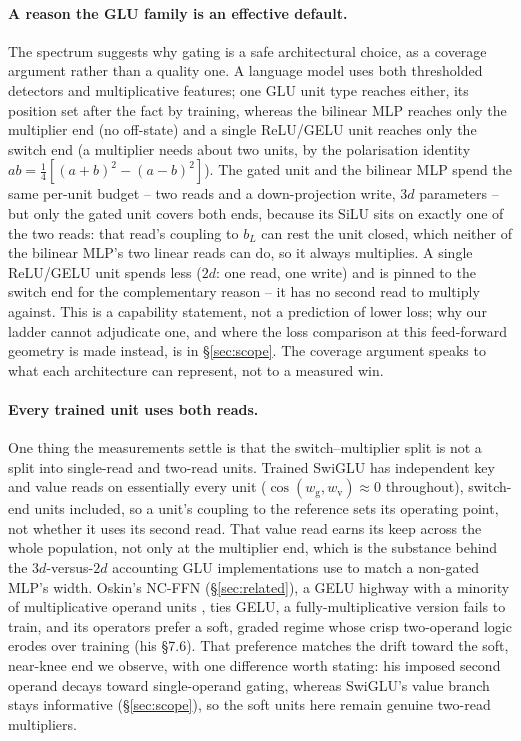 \documentclass[11pt]{article}
\newcommand{\bl}{b_L}
\newcommand{\wg}{w_{\mathrm{g}}}
\newcommand{\wv}{w_{\mathrm{v}}}
\begin{document}
\paragraph{A reason the GLU family is an effective default.}
The spectrum suggests why gating is a safe architectural choice, as a coverage
argument rather than a quality one. A language model uses both thresholded
detectors and multiplicative features; one GLU unit type reaches either, its
position set after the fact by training, whereas the bilinear MLP reaches only
the multiplier end (no off-state) and a single ReLU/GELU unit reaches only the
switch end (a multiplier needs about two units, by the polarisation identity
$ab=\tfrac14[(a{+}b)^2-(a{-}b)^2]$). The gated unit and the bilinear MLP spend
the same per-unit budget -- two reads and a down-projection write, $3d$
parameters -- but only the gated unit covers both ends, because its SiLU sits
on exactly one of the two reads: that read's coupling to $\bl$ can rest the
unit closed, which neither of the bilinear MLP's two linear reads can do, so it
always multiplies. A single ReLU/GELU unit spends less ($2d$: one read, one
write) and is pinned to the switch end for the complementary reason -- it has no
second read to multiply against. This is a capability statement,
not a prediction of lower loss; why our ladder cannot adjudicate one, and where
the loss comparison at this feed-forward geometry is made instead, is in
\S\ref{sec:scope}. The coverage argument speaks to what each architecture can
represent, not to a measured win.

\paragraph{Every trained unit uses both reads.}
One thing the measurements settle is that the switch--multiplier split is not a
split into single-read and two-read units. Trained SwiGLU has independent key and
value reads on essentially every unit ($\cos(\wg,\wv)\approx 0$ throughout),
switch-end units included, so a unit's coupling to the reference sets its
operating point, not whether it uses its second read. That value read earns its
keep across the whole population, not only at the multiplier end, which is the
substance behind the $3d$-versus-$2d$ accounting GLU implementations use to
match a non-gated MLP's width. Oskin's NC-FFN (\S\ref{sec:related}), a GELU
highway with a minority of multiplicative operand units \citep{oskin2026}, ties
GELU, a fully-multiplicative version fails to train, and its operators prefer a
soft, graded regime whose crisp two-operand logic erodes over training (his
\S7.6).
That preference matches the drift toward the soft, near-knee end we observe, with
one difference worth stating: his imposed second operand decays toward
single-operand gating, whereas SwiGLU's value branch stays informative
(\S\ref{sec:scope}), so the soft units here remain genuine two-read multipliers.
\end{document}
